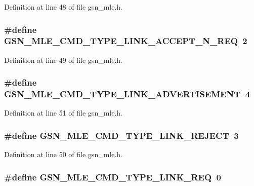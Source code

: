 Definition at line 48 of file gsn\_\-mle.h.

\hypertarget{a00527_a7cfcbafeb3d1403454fb38d75befe421}{
\subsubsection[{GSN\_\-MLE\_\-CMD\_\-TYPE\_\-LINK\_\-ACCEPT\_\-N\_\-REQ}]{\setlength{\rightskip}{0pt plus 5cm}\#define GSN\_\-MLE\_\-CMD\_\-TYPE\_\-LINK\_\-ACCEPT\_\-N\_\-REQ~2}}
\label{a00527_a7cfcbafeb3d1403454fb38d75befe421}


Definition at line 49 of file gsn\_\-mle.h.

\hypertarget{a00527_a4cfc5b0b258639000f20965f29c391a8}{
\subsubsection[{GSN\_\-MLE\_\-CMD\_\-TYPE\_\-LINK\_\-ADVERTISEMENT}]{\setlength{\rightskip}{0pt plus 5cm}\#define GSN\_\-MLE\_\-CMD\_\-TYPE\_\-LINK\_\-ADVERTISEMENT~4}}
\label{a00527_a4cfc5b0b258639000f20965f29c391a8}


Definition at line 51 of file gsn\_\-mle.h.

\hypertarget{a00527_a8694fcff6175af65bb59227344bd9a76}{
\subsubsection[{GSN\_\-MLE\_\-CMD\_\-TYPE\_\-LINK\_\-REJECT}]{\setlength{\rightskip}{0pt plus 5cm}\#define GSN\_\-MLE\_\-CMD\_\-TYPE\_\-LINK\_\-REJECT~3}}
\label{a00527_a8694fcff6175af65bb59227344bd9a76}


Definition at line 50 of file gsn\_\-mle.h.

\hypertarget{a00527_a7665e58f1aaf7053d4d670b220d1ce72}{
\subsubsection[{GSN\_\-MLE\_\-CMD\_\-TYPE\_\-LINK\_\-REQ}]{\setlength{\rightskip}{0pt plus 5cm}\#define GSN\_\-MLE\_\-CMD\_\-TYPE\_\-LINK\_\-REQ~0}}
\label{a00527_a7665e58f1aaf7053d4d670b220d1ce72}


